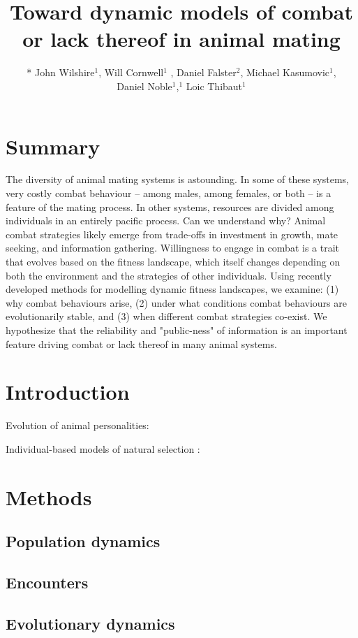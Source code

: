 \documentclass[a4paper,11pt]{article}
\title{Toward dynamic models of combat or lack thereof in animal mating}
\author{
* John Wilshire$^1$, Will Cornwell$^1$ , Daniel Falster$^2$, Michael Kasumovic$^1$, \\
Daniel Noble$^1$,$^1$ Loic Thibaut$^1$}
\affiliation{
*final list and order undecided\\
$^1$ University of NSW\\
$^2$ Macquarie University\\
}
\date{}
\begin{document}
\mstitlepage
\noindent
\linenumbers

\section{Summary}
The diversity of animal mating systems is astounding. In some of these
systems, very costly combat behaviour -- among males, among females, or
both -- is a feature of the mating process.  In other systems, resources
are divided among individuals in an entirely pacific process.  Can we
understand why? Animal combat strategies likely emerge from trade-offs
in investment in growth, mate seeking, and information gathering.
Willingness to engage in combat is a trait that evolves based on the
fitness landscape, which itself changes depending on both the
environment and the strategies of other individuals.  Using recently
developed methods for modelling dynamic fitness landscapes, we examine:
(1) why combat behaviours arise, (2) under what conditions combat
behaviours are evolutionarily stable, and (3) when different combat
strategies co-exist.  We hypothesize that the reliability and
"public-ness" of information is an important feature driving combat or
lack thereof in many animal systems.

\section{Introduction}

Evolution of animal personalities: \citep{Wolf-2007}

Individual-based models of natural selection :\citep{MGonigle-2012}

\section{Methods}

\subsection{Population dynamics}

\subsection{Encounters}

\subsection{Evolutionary dynamics}
\end{document}
